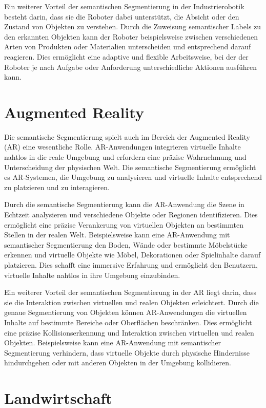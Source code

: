 Ein weiterer Vorteil der semantischen Segmentierung in der Industrierobotik
besteht darin, dass sie die Roboter dabei unterstützt, die Absicht oder den
Zustand von Objekten zu verstehen. Durch die Zuweisung semantischer Labels zu
den erkannten Objekten kann der Roboter beispielsweise zwischen verschiedenen
Arten von Produkten oder Materialien unterscheiden und entsprechend darauf
reagieren. Dies ermöglicht eine adaptive und flexible Arbeitsweise, bei der der
Roboter je nach Aufgabe oder Anforderung unterschiedliche Aktionen ausführen
kann.
\section{Augmented Reality}
Die semantische Segmentierung spielt auch im Bereich der Augmented Reality (AR)
eine wesentliche Rolle. AR-Anwendungen integrieren virtuelle Inhalte nahtlos in
die reale Umgebung und erfordern eine präzise Wahrnehmung und Unterscheidung
der physischen Welt. Die semantische Segmentierung ermöglicht es AR-Systemen,
die Umgebung zu analysieren und virtuelle Inhalte entsprechend zu platzieren
und zu interagieren.

Durch die semantische Segmentierung kann die AR-Anwendung die Szene in Echtzeit
analysieren und verschiedene Objekte oder Regionen identifizieren. Dies
ermöglicht eine präzise Verankerung von virtuellen Objekten an bestimmten
Stellen in der realen Welt. Beispielsweise kann eine AR-Anwendung mit
semantischer Segmentierung den Boden, Wände oder bestimmte Möbelstücke erkennen
und virtuelle Objekte wie Möbel, Dekorationen oder Spielinhalte darauf
platzieren. Dies schafft eine immersive Erfahrung und ermöglicht den Benutzern,
virtuelle Inhalte nahtlos in ihre Umgebung einzubinden.

Ein weiterer Vorteil der semantischen Segmentierung in der AR liegt darin, dass
sie die Interaktion zwischen virtuellen und realen Objekten erleichtert. Durch
die genaue Segmentierung von Objekten können AR-Anwendungen die virtuellen
Inhalte auf bestimmte Bereiche oder Oberflächen beschränken. Dies ermöglicht
eine präzise Kollisionserkennung und Interaktion zwischen virtuellen und realen
Objekten. Beispielsweise kann eine AR-Anwendung mit semantischer Segmentierung
verhindern, dass virtuelle Objekte durch physische Hindernisse hindurchgehen
oder mit anderen Objekten in der Umgebung kollidieren.

\section{Landwirtschaft}

